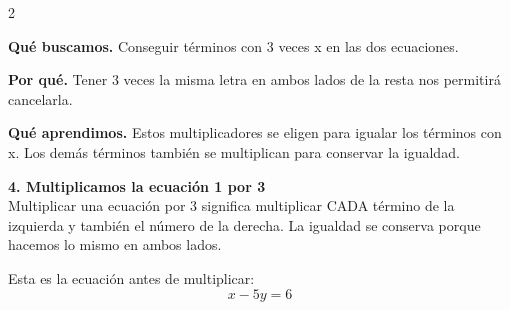 \documentclass[11pt,a4paper,landscape]{article}
\begin{document}
\begin{multicols*}{2}
\begin{minipage}{\linewidth}
\par\smallskip\textbf{Qué buscamos.} Conseguir términos con 3 veces x en las dos ecuaciones.
\par\smallskip\textbf{Por qué.} Tener 3 veces la misma letra en ambos lados de la resta nos permitirá cancelarla.
\par{}\par\smallskip
\par\smallskip\textbf{Qué aprendimos.} Estos multiplicadores se eligen para igualar los términos con x. Los demás términos también se multiplican para conservar la igualdad.
\end{minipage}\par\medskip
\noindent\begin{minipage}{\linewidth}\textbf{4. Multiplicamos la ecuación 1 por 3}\\[2pt]Multiplicar una ecuación por 3 significa multiplicar CADA término de la izquierda y también el número de la derecha. La igualdad se conserva porque hacemos lo mismo en ambos lados.
\par\smallskip Esta es la ecuación antes de multiplicar:
\[x - 5y = 6\]
\par{}\par\smallskip

\end{minipage}
\end{multicols*}
\end{document}

